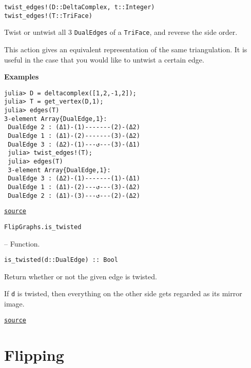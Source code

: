 \begin{adjustwidth}{2em}{0pt}


\begin{verbatim}
twist_edges!(D::DeltaComplex, t::Integer)
twist_edges!(T::TriFace)
\end{verbatim}

Twist or untwist all 3 \texttt{DualEdges} of a \texttt{TriFace}, and reverse the side order.

This action gives an equivalent representation of the same triangulation. It is useful in the case that you would like to untwist a certain edge.

\textbf{Examples}


\begin{verbatim}
julia> D = deltacomplex([1,2,-1,2]);
julia> T = get_vertex(D,1);
julia> edges(T)
3-element Array{DualEdge,1}:
 DualEdge 2 : (Δ1)-(1)-------(2)-(Δ2)
 DualEdge 1 : (Δ1)-(2)-------(3)-(Δ2)
 DualEdge 3 : (Δ2)-(1)---↺---(3)-(Δ1)
 julia> twist_edges!(T);
 julia> edges(T)
 3-element Array{DualEdge,1}:
 DualEdge 3 : (Δ2)-(1)-------(1)-(Δ1)
 DualEdge 1 : (Δ1)-(2)---↺---(3)-(Δ2)
 DualEdge 2 : (Δ1)-(3)---↺---(2)-(Δ2)
\end{verbatim}



\href{https://github.com/schto223/FlipGraphs.jl/blob/490c01a7adf74b42f27dda05099165c47ae8133e/src/deltaComplex.jl#L801-L826}{\texttt{source}}


\end{adjustwidth}
\hypertarget{5140467616149147479}{\texttt{FlipGraphs.is\_twisted}}  -- {Function.}

\begin{adjustwidth}{2em}{0pt}


\begin{verbatim}
is_twisted(d::DualEdge) :: Bool
\end{verbatim}

Return whether or not the given edge is twisted. 

If \texttt{d} is twisted, then everything on the other side gets regarded as its mirror image. 



\href{https://github.com/schto223/FlipGraphs.jl/blob/490c01a7adf74b42f27dda05099165c47ae8133e/src/deltaComplex.jl#L125-L131}{\texttt{source}}


\end{adjustwidth}

\section{Flipping}



